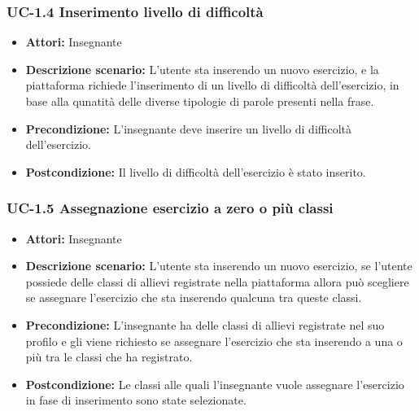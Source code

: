 \subsubsection{UC-1.4 Inserimento livello di difficoltà}
\begin{itemize}
\item \textbf{Attori: }Insegnante
\item \textbf{Descrizione scenario: }L'utente sta inserendo un nuovo esercizio, e la piattaforma richiede l'inserimento di un livello di difficoltà dell'esercizio, in base alla qunatità delle diverse tipologie di parole presenti nella frase.
\item \textbf{Precondizione: }L'insegnante deve inserire un livello di difficoltà dell'esercizio.
\item \textbf{Postcondizione: }Il livello di difficoltà dell'esercizio è stato inserito.
\end{itemize}
\subsubsection{UC-1.5 Assegnazione esercizio a zero o più classi}
\begin{itemize}
\item \textbf{Attori: }Insegnante
\item \textbf{Descrizione scenario: }L'utente sta inserendo un nuovo esercizio, se l'utente possiede delle classi di allievi registrate nella piattaforma allora può scegliere se assegnare l'esercizio che sta inserendo qualcuna tra queste classi.
\item \textbf{Precondizione: }L'insegnante ha delle classi di allievi registrate nel suo profilo e gli viene richiesto se assegnare l'esercizio che sta inserendo a una o più tra le classi che ha registrato.
\item \textbf{Postcondizione: }Le classi alle quali l'insegnante vuole assegnare l'esercizio in fase di inserimento sono state selezionate.
\end{itemize}

